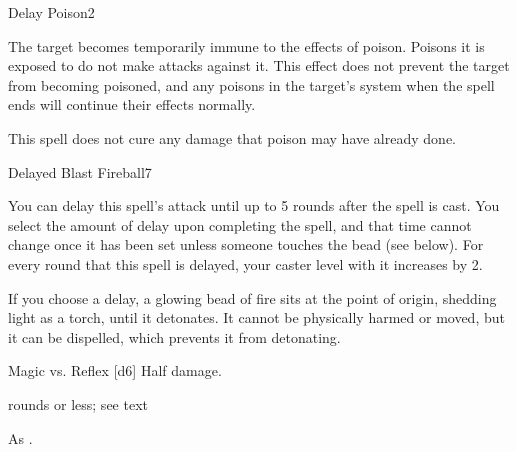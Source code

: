 \begin{spellsection}{Delay Poison}{2}
\begin{spellheader}
\end{spellheader}
\begin{spellcontent}
    \begin{spelltargetinginfo}
    \end{spelltargetinginfo}
    \begin{spelleffects}
        \spelleffect The target becomes temporarily immune to the effects of poison. Poisons it is exposed to do not make attacks against it. This effect does not prevent the target from becoming poisoned, and any poisons in the target's system when the spell ends will continue their effects normally. 
        \spelldur \durshort
    \end{spelleffects}
\end{spellcontent}
\begin{spellfooter}
    \spellnotes This spell does not cure any damage that poison may have already done.
\end{spellfooter}
\end{spellsection}

\begin{spellsection}{Delayed Blast Fireball}{7}
\begin{spellheader}
\end{spellheader}
\begin{spellcontent}
    \begin{spelltargetinginfo}
    \end{spelltargetinginfo}
    \begin{spelleffects}
        \spellspecial You can delay this spell's attack until up to 5 rounds after the spell is cast. You select the amount of delay upon completing the spell, and that time cannot change once it has been set unless someone touches the bead (see below). For every round that this spell is delayed, your caster level with it increases by 2.
        
        If you choose a delay, a glowing bead of fire sits at the point of origin, shedding light as a torch, until it detonates. It cannot be physically harmed or moved, but it can be dispelled, which prevents it from detonating.
        \begin{spellattack}{Magic vs. Reflex}
            \spellsuccess {}[d6]
            \spellfailure Half damage.
        \end{spellattack}
         rounds or less; see text
    \end{spelleffects}
\end{spellcontent}
\begin{spellfooter}
    \spellnotes As .
\end{spellfooter}
\end{spellsection}

